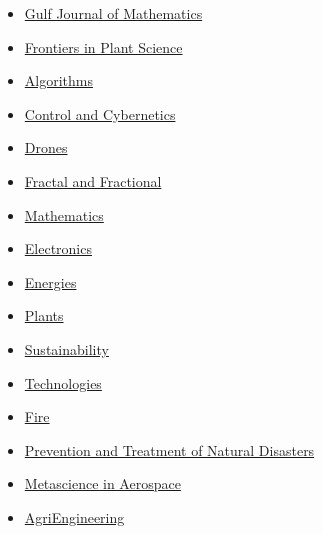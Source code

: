 \documentclass[final, a4paper, oneside, 12pt]{article}
\numberwithin{equation}{section}
\begin{document}
\begin{itemize}
    \item \href{https://gjom.org/}%
    {Gulf Journal of Mathematics}

    \item \href{https://www.frontiersin.org/journals/plant-science/}%
    {Frontiers in Plant Science}

    \item \href{https://www.mdpi.com/journal/algorithms/}%
    {Algorithms}

    \item \href{http://control.ibspan.waw.pl:3000/mainpage/}%
    {Control and Cybernetics}

    \item \href{https://www.mdpi.com/journal/drones/}%
    {Drones}

    \item \href{https://www.mdpi.com/journal/fractalfract/}%
    {Fractal and Fractional}

    \item \href{https://www.mdpi.com/journal/mathematics/}%
    {Mathematics}

    \item \href{https://www.mdpi.com/journal/electronics/}%
    {Electronics}

    \item \href{https://www.mdpi.com/journal/energies/}%
    {Energies}

    \item \href{https://www.mdpi.com/journal/plants/}%
    {Plants}

    \item \href{https://www.mdpi.com/journal/sustainability/}%
    {Sustainability}

    \item \href{https://www.mdpi.com/journal/technologies/}%
    {Technologies}

    \item \href{https://www.mdpi.com/journal/fire/}%
    {Fire}

    \item \href{https://ojs.ukscip.com/index.php/ptnd/}%
    {Prevention and Treatment of Natural Disasters}

    \item \href{https://www.aimspress.com/journal/mina/}%
    {Metascience in Aerospace}

    \item \href{https://www.mdpi.com/journal/agriengineering/}%
    {AgriEngineering}
    

\end{itemize}
\end{document}
